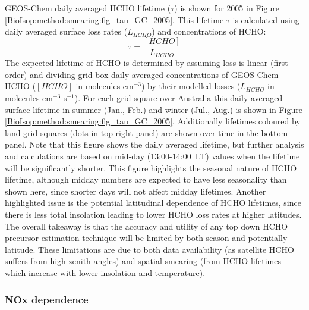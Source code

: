       GEOS-Chem daily averaged HCHO lifetime ($\tau$) is shown for 2005 in Figure \ref{BioIsop:method:smearing:fig_tau_GC_2005}.
      This lifetime $\tau$ is calculated using daily averaged surface loss rates ($L_{HCHO}$) and concentrations of HCHO:
      \begin{equation*}
      \tau = \frac{[HCHO]}{L_{HCHO}}
      \end{equation*}
      The expected lifetime of HCHO is determined by assuming loss is linear (first order) and dividing grid box daily averaged concentrations of GEOS-Chem HCHO ($[HCHO]$ in molecules cm$^{-3}$) by their modelled losses ($L_{HCHO}$ in molecules cm$^{-3}$ s$^{-1}$).
      For each grid square over Australia this daily averaged surface lifetime in summer (Jan., Feb.) and winter (Jul., Aug.) is shown in Figure \ref{BioIsop:method:smearing:fig_tau_GC_2005}.
      Additionally lifetimes coloured by land grid squares (dots in top right panel) are shown over time in the bottom panel.
      Note that this figure shows the daily averaged lifetime, but further analysis and calculations are based on mid-day (13:00-14:00~LT) values when the lifetime will be significantly shorter. 
      This figure highlights the seasonal nature of HCHO lifetime, although midday numbers are expected to have less seasonality than shown here, since shorter days will not affect midday lifetimes.
      Another highlighted issue is the potential latitudinal dependence of HCHO lifetimes, since there is less total insolation leading to lower HCHO loss rates at higher latitudes.
      The overall takeaway is that the accuracy and utility of any top down HCHO precursor estimation technique will be limited by both season and potentially latitude.
      These limitations are due to both data availability (as satellite HCHO suffers from high zenith angles) and spatial smearing (from HCHO lifetimes which increase with lower insolation and temperature).
      
      
    
    \subsubsection{NOx dependence}
      
